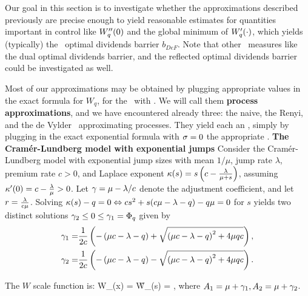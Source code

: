 







Our goal in this section is to investigate whether the approximations described previously
 are precise enough to yield reasonable estimates for quantities important in control like $ W''_q(0) $ and the global minimum   of $ W'_q(\cdot)$, which yields (typically) the \deF\ optimal dividends barrier $b_{DeF}$.  Note that other \perf\ measures like the dual optimal dividends barrier, and the reflected optimal dividends barrier could be investigated as well. 

 Most of our approximations may be obtained by plugging appropriate values  in  the exact formula  for $W_q$, for  the \CLp\ with \expoc. We will call them {\bf process approximations}, and we have encountered already three:
 \BEN \im   the naive, \im the Renyi, and
  \im the  de Vylder \expo\ approximating processes. \EEN
     They yield each an \app, simply  by plugging in the exact exponential formula  with $\sigma=0$ the appropriate  \paras.
 \beXa
  {\bf The Cram\'{e}r-Lundberg model with exponential jumps }
Consider  the Cram\'{e}r-Lundberg model
 with exponential jump sizes with mean $1/\mu$, jump
rate $\lambda$, premium rate $c>0$,
and Laplace exponent
$\kappa(s)=s \left(c-\frac{\lambda}{\mu+s}\right)$, assuming $\kappa'(0) = c- \frac{\lambda} {\mu} > 0$. Let $\gamma=\mu - \lambda/c$ denote the adjustment coefficient, and let $r=\frac {\lambda}{c \mu}$. Solving $\kappa(s)-q=0 \Leftrightarrow c s^2 + s(c \mu -\lambda -q) - q \mu=0$ for $s$ yields two distinct solutions $\gamma_{2} \leq 0 \leq \gamma_{1}=\Phi_{q}$ given by
\begin{align*}
\gamma_{1} =& \frac{1}{2c} \left(- \left(\mu c -\lambda - q\right) + \sqrt{\left(\mu c -\lambda - q \right)^2 + 4\mu q c} \right),\\
\gamma_{2} =& \frac{1}{2c} \left(- \left(\mu c -\lambda - q\right) - \sqrt{\left(\mu c -\lambda - q \right)^2 + 4\mu q c} \right).
\end{align*}


The $W$ scale function is:
\be {}  W_{\q}(x) =   \Eq \H W_{\q}(s) = ,\ee
where $A_{1} = \mu + \gamma_{1}, A_{2} = \mu + \gamma_{2}$.

